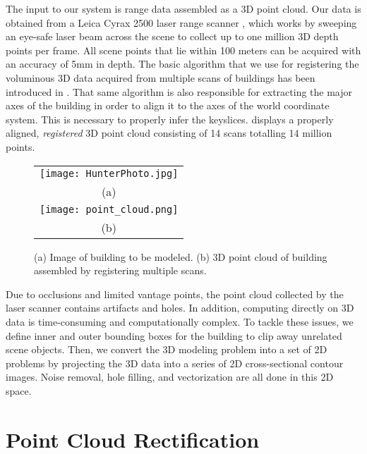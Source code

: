 The input to our system is range data assembled as a 3D point cloud.
Our data is obtained from a Leica Cyrax 2500 laser range scanner \cite{RDP_LRS},
which works by sweeping an eye-safe laser beam across the scene to collect
up to one million 3D depth points per frame.
All scene points that lie within 100 meters can be acquired with an accuracy
of 5mm in depth.
The basic algorithm that we use for registering the voluminous 3D data
acquired from multiple scans of buildings has been introduced in
\cite{RDP_LS}.
That same algorithm is also responsible for extracting the major axes
of the building in order to align it to the axes of the world coordinate
system.
This is necessary to properly infer the keyslices.
 displays a properly aligned, {\it registered} 3D point cloud
consisting of 14 scans totalling 14 million points.

\begin{figure}[htbp]
\begin{center}
\begin{tabular}{c}
	\texttt{[image: HunterPhoto.jpg]} \\
	(a)\\
	\texttt{[image: point\_cloud.png]} \\
	(b)
\end{tabular}
\end{center}
\caption{
(a) Image of building to be modeled.
(b) 3D point cloud of building assembled by registering multiple scans.
}
\label{fig:IR_2_DXF}
\end{figure}

Due to occlusions and limited vantage points, the point cloud collected by the
laser scanner contains artifacts and holes.
In addition, computing directly on 3D data is time-consuming and
computationally complex.
To tackle these issues, we define inner and outer bounding boxes for the
building to clip away unrelated scene objects.
Then, we convert the 3D modeling problem into a set of 2D problems by
projecting the 3D data into a series of 2D cross-sectional contour images.
Noise removal, hole filling, and vectorization are all done in this
2D space.

\section{Point Cloud Rectification}
\label{sec:rect}

